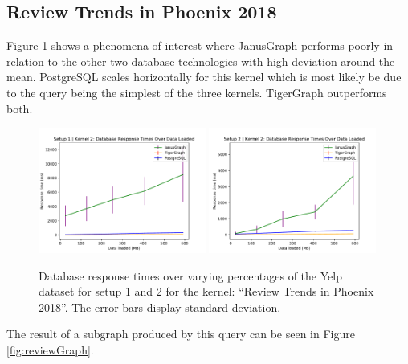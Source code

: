 \subsection{Review Trends in Phoenix 2018}
\label{sec:resultReviews2018}

Figure \ref{fig:reviewPerfResults} shows a phenomena of interest where JanusGraph performs poorly in relation to the other two database technologies with high deviation around the mean. PostgreSQL scales horizontally for this kernel which is most likely be due to the query being the simplest of the three kernels. TigerGraph outperforms both.

\begin{figure}[h]
    \centering
    \includegraphics[width=0.49\textwidth]{img/7_yelpPerfResults/reviewsPlotSetup1.pdf}
    \includegraphics[width=0.49\textwidth]{img/7_yelpPerfResults/reviewsPlotSetup2.pdf}
    \caption{Database response times over varying percentages of the Yelp dataset for setup 1 and 2 for the kernel: ``Review Trends in Phoenix 2018''. The error bars display standard deviation.}
    \label{fig:reviewPerfResults}
\end{figure}

The result of a subgraph produced by this query can be seen in Figure \ref{fig:reviewGraph}.

